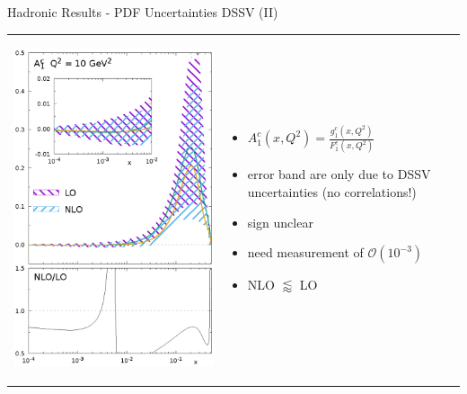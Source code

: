 \begin{frame}{Hadronic Results - PDF Uncertainties DSSV (II)}
\begin{tabular}{wn}
\begin{center}
\includegraphics[height=.97\textheight]{img/A1-pdf}
\end{center} & 
\begin{itemize}
\item $A_1^c(x,Q^2) = \frac{g_1^c(x,Q^2)}{F_1^c(x,Q^2)}$
\item error band are only due to DSSV uncertainties (no correlations!)
\item sign unclear
\item need measurement of $\mathcal O(10^{-3})$
\item NLO $\lessapprox$ LO
\end{itemize}
\end{tabular}
\end{frame}

